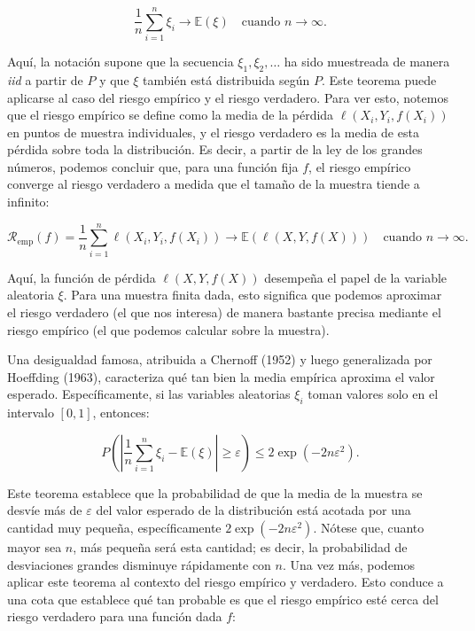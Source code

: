 \documentclass{report}
\begin{document}
\[
\frac{1}{n} \sum_{i=1}^n \xi_i \to \mathbb{E}(\xi) \quad \text{cuando } n \to \infty.
\]

Aquí, la notación supone que la secuencia \(\xi_1, \xi_2, \dots\) ha sido muestreada de manera \textit{iid}
a partir de \(P\) y que \(\xi\) también está distribuida según \(P\). Este teorema puede aplicarse al caso del
riesgo empírico y el riesgo verdadero. Para ver esto, notemos que el riesgo empírico se define como la media de
la pérdida \(\ell(X_i, Y_i, f(X_i))\) en puntos de muestra individuales, y el riesgo verdadero es la media de
esta pérdida sobre toda la distribución. Es decir, a partir de la ley de los grandes números, podemos concluir
que, para una función fija \(f\), el riesgo empírico converge al riesgo verdadero a medida que el tamaño de la
muestra tiende a infinito:

\[
\mathcal{R}_{\text{emp}}(f) = \frac{1}{n} \sum_{i=1}^n \ell(X_i, Y_i, f(X_i)) \to \mathbb{E}(\ell(X, Y, f(X))) \quad
\text{cuando } n \to \infty.
\]

Aquí, la función de pérdida \(\ell(X, Y, f(X))\) desempeña el papel de la variable aleatoria \(\xi\). Para una
muestra finita dada, esto significa que podemos aproximar el riesgo verdadero (el que nos interesa) de manera
bastante precisa mediante el riesgo empírico (el que podemos calcular sobre la muestra).

Una desigualdad famosa, atribuida a Chernoff (1952) y luego generalizada por Hoeffding (1963), caracteriza qué
tan bien la media empírica aproxima el valor esperado. Específicamente, si las variables aleatorias \(\xi_i\)
toman valores solo en el intervalo \([0, 1]\), entonces:

\begin{equation}\label{eq:Chernoff-Hoeffding}
P\left( \left| \frac{1}{n} \sum_{i=1}^n \xi_i - \mathbb{E}(\xi) \right| \geq \varepsilon \right) \leq
2 \exp(-2n\varepsilon^2).
\end{equation}

Este teorema establece que la probabilidad de que la media de la muestra se desvíe más de \(\varepsilon\) del
valor esperado de la distribución está acotada por una cantidad muy pequeña, específicamente \(2 \exp(-2n\varepsilon^2)\).
Nótese que, cuanto mayor sea \(n\), más pequeña será esta cantidad; es decir, la probabilidad de desviaciones
grandes disminuye rápidamente con \(n\). Una vez más, podemos aplicar este teorema al contexto del riesgo empírico
y verdadero. Esto conduce a una cota que establece qué tan probable es que el riesgo empírico esté cerca del
riesgo verdadero para una función dada \(f\):
\end{document}
